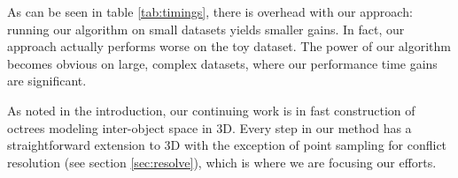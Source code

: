 \documentclass[final,3p,times,twocolumn]{elsarticle}
\begin{document}
\begin{table*}
{\begin{tabular}{lcc|c|cc|cc}
    \bottomrule
  \end{tabular}}
  \caption{Table of quadtree computation statistics and timings. \emph{Ours} is the approach described in this paper and \emph{Prev} is the approach by Edwards \etal \cite{edwards2015approximating}. Columns are: \emph{objects} - the number of objects in the dataset; \emph{object facets} - the number of line segments (2D) of all objects in the dataset; \emph{quadtree depth} - required quadtree depth in order to resolve objects; \emph{time (ms)} - milliseconds to build the quadtree; \emph{quad cells} - number of quadtree cells.  }
  \label{tab:timings}
\end{table*}

As can be seen in table \ref{tab:timings}, there is overhead with our approach: running our algorithm on small datasets yields smaller gains. In fact, our approach actually performs worse on the toy dataset. The power of our algorithm becomes obvious on large, complex datasets, where our performance time gains are significant.

As noted in the introduction, our continuing work is in fast construction of octrees modeling inter-object space in 3D.
Every step in our method has a straightforward extension to 3D with the exception of point sampling for conflict resolution (see section \ref{sec:resolve}), which is where we are focusing our efforts.


\end{document}
